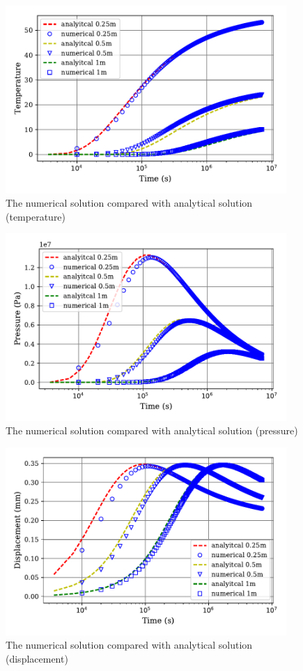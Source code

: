 \documentclass[a4paper,10pt]{article}
\begin{document}
\begin{figure}
	\centering
		\includegraphics*[width=0.95\textwidth]{figures/temperature.pdf}
	\caption{The numerical solution compared with analytical solution (temperature)}
	\label{fig:point_injection_temperature}
\end{figure} 
\begin{figure}
	\centering
		\includegraphics*[width=0.95\textwidth]{figures/pressure.pdf}
	\caption{The numerical solution compared with analytical solution (pressure)}
	\label{fig:point_injection_pressure}
\end{figure} 
\begin{figure}
	\centering
		\includegraphics*[width=0.95\textwidth]{figures/displacement.pdf}
	\caption{The numerical solution compared with analytical solution (displacement)}
	\label{fig:point_injection_displacement}
\end{figure} 
\end{document}
